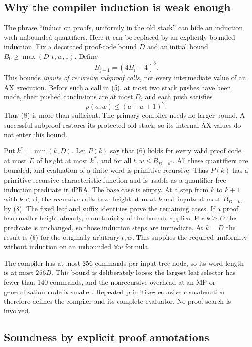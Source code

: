 \subsection{Why the compiler induction is weak enough}

The phrase ``induct on proofs, uniformly in the old stack'' can hide
an induction with unbounded quantifiers.  Here it can be replaced by
an explicitly bounded induction.  Fix a decorated proof-code bound $D$
and an initial bound $B_0\geq\max(D,t,w,1)$.  Define
\[
             B_{j+1}=(4B_j+4)^8.                          \tag{8}
\]
This bounds \emph{inputs of recursive subproof calls}, not every
intermediate value of an AX execution.  Before such a call in (5),
at most two stack pushes have been made, their pushed conclusions
are at most $D$, and each push satisfies
\[
        p(a,w)\leq(a+w+1)^2.
\]
Thus (8) is more than sufficient.  The primary compiler needs no
larger bound.  A successful subproof restores its protected old
stack, so its internal AX values do not enter this bound.

Put $k^*=\min(k,D)$.  Let $P(k)$ say that (6) holds for every valid proof
code at most $D$ of height at most $k^*$, and for all
$t,w\leq B_{D-k^*}$.
All these quantifiers are bounded, and evaluation of a finite word is
primitive recursive.  Thus $P(k)$ has a primitive-recursive characteristic
function and is usable as a quantifier-free induction predicate in
iPRA.  The base case is empty.  At a step from $k$ to $k+1$ with $k<D$, the
recursive calls have height at most $k$ and inputs at most $B_{D-k}$,
by (8).  The fixed leaf and suffix identities prove the remaining
cases.  If a proof has smaller height already, monotonicity of the
bounds applies.  For $k\geq D$ the predicate is unchanged, so those
induction steps are immediate.  At $k=D$ the result is (6) for the originally arbitrary
$t,w$.  This supplies the required uniformity without induction on an
unbounded $\forall w$ formula.

The compiler has at most 256 commands per input tree node, so its
word length is at most $256D$.  This bound is deliberately loose:
the largest leaf selector has fewer than 140 commands, and the
nonrecursive overhead at an MP or generalization node is smaller.
Repeated primitive-recursive concatenation therefore defines the
compiler and its complete evaluator.  No proof search is involved.

\subsection{Soundness by explicit proof annotations}


